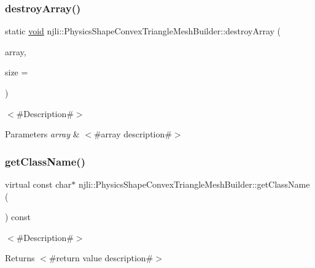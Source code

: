 \subsubsection{\texorpdfstring{destroy\+Array()}{destroyArray()}}
{\footnotesize\ttfamily static \mbox{\hyperlink{_thread_8h_af1e856da2e658414cb2456cb6f7ebc66}{void}} njli\+::\+Physics\+Shape\+Convex\+Triangle\+Mesh\+Builder\+::destroy\+Array (\begin{DoxyParamCaption}\item[{\mbox{\hyperlink{classnjli_1_1_physics_shape_convex_triangle_mesh_builder}{Physics\+Shape\+Convex\+Triangle\+Mesh\+Builder}} $\ast$$\ast$}]{array,  }\item[{const \mbox{\hyperlink{_util_8h_a10e94b422ef0c20dcdec20d31a1f5049}{u32}}}]{size = {} }\end{DoxyParamCaption})\hspace{0.3cm}{\ttfamily [static]}}

$<$\#\+Description\#$>$


\begin{DoxyParams}{Parameters}
{\em array} & $<$\#array description\#$>$ \\
\hline
\end{DoxyParams}
\mbox{\label{classnjli_1_1_physics_shape_convex_triangle_mesh_builder_a89df3bb6663f332d53cd2e589949283c}} 
\subsubsection{\texorpdfstring{get\+Class\+Name()}{getClassName()}}
{\footnotesize\ttfamily virtual const char$\ast$ njli\+::\+Physics\+Shape\+Convex\+Triangle\+Mesh\+Builder\+::get\+Class\+Name (\begin{DoxyParamCaption}{ }\end{DoxyParamCaption}) const\hspace{0.3cm}{\ttfamily [virtual]}}

$<$\#\+Description\#$>$

\begin{DoxyReturn}{Returns}
$<$\#return value description\#$>$ 
\end{DoxyReturn}


